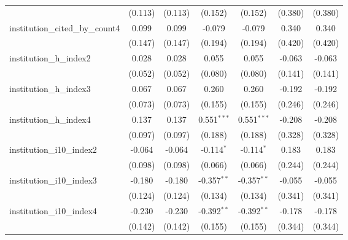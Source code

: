 \begin{tabular}{lcccccc}
                                         & (0.113)        & (0.113)        & (0.152)       & (0.152)       & (0.380)      & (0.380)\\   
   institution\_cited\_by\_count4        & 0.099          & 0.099          & -0.079        & -0.079        & 0.340        & 0.340\\   
                                         & (0.147)        & (0.147)        & (0.194)       & (0.194)       & (0.420)      & (0.420)\\   
   institution\_h\_index2                & 0.028          & 0.028          & 0.055         & 0.055         & -0.063       & -0.063\\   
                                         & (0.052)        & (0.052)        & (0.080)       & (0.080)       & (0.141)      & (0.141)\\   
   institution\_h\_index3                & 0.067          & 0.067          & 0.260         & 0.260         & -0.192       & -0.192\\   
                                         & (0.073)        & (0.073)        & (0.155)       & (0.155)       & (0.246)      & (0.246)\\   
   institution\_h\_index4                & 0.137          & 0.137          & 0.551$^{***}$ & 0.551$^{***}$ & -0.208       & -0.208\\   
                                         & (0.097)        & (0.097)        & (0.188)       & (0.188)       & (0.328)      & (0.328)\\   
   institution\_i10\_index2              & -0.064         & -0.064         & -0.114$^{*}$  & -0.114$^{*}$  & 0.183        & 0.183\\   
                                         & (0.098)        & (0.098)        & (0.066)       & (0.066)       & (0.244)      & (0.244)\\   
   institution\_i10\_index3              & -0.180         & -0.180         & -0.357$^{**}$ & -0.357$^{**}$ & -0.055       & -0.055\\   
                                         & (0.124)        & (0.124)        & (0.134)       & (0.134)       & (0.341)      & (0.341)\\   
   institution\_i10\_index4              & -0.230         & -0.230         & -0.392$^{**}$ & -0.392$^{**}$ & -0.178       & -0.178\\   
                                         & (0.142)        & (0.142)        & (0.155)       & (0.155)       & (0.344)      & (0.344)\\   

\end{tabular}
